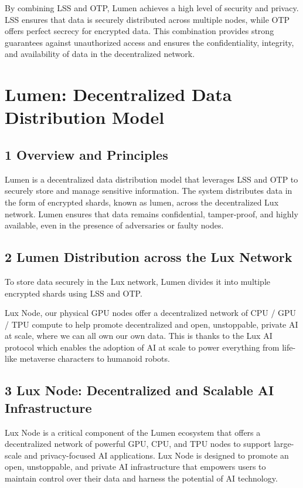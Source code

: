 \documentclass[11pt]{article}
\begin{document}
By combining LSS and OTP, Lumen achieves a high level of security and privacy. LSS ensures that data is securely distributed across multiple nodes, while OTP offers perfect secrecy for encrypted data. This combination provides strong guarantees against unauthorized access and ensures the confidentiality, integrity, and availability of data in the decentralized network.


\section{Lumen: Decentralized Data Distribution Model}

\subsection{1 Overview and Principles}

Lumen is a decentralized data distribution model that leverages LSS and OTP to securely store and manage sensitive information. The system distributes data in the form of encrypted shards, known as lumen, across the decentralized Lux network. Lumen ensures that data remains confidential, tamper-proof, and highly available, even in the presence of adversaries or faulty nodes.


\subsection{2 Lumen Distribution across the Lux Network}

To store data securely in the Lux network, Lumen divides it into multiple encrypted shards using LSS and OTP.


Lux Node, our physical GPU nodes offer a decentralized network of CPU / GPU / TPU compute to help promote decentralized and open, unstoppable, private AI at scale, where we can all own our own data. This is thanks to the Lux AI protocol which enables the adoption of AI at scale to power everything from life-like metaverse characters to humanoid robots.


\subsection{3 Lux Node: Decentralized and Scalable AI Infrastructure}

Lux Node is a critical component of the Lumen ecosystem that offers a decentralized network of powerful GPU, CPU, and TPU nodes to support large-scale and privacy-focused AI applications. Lux Node is designed to promote an open, unstoppable, and private AI infrastructure that empowers users to maintain control over their data and harness the potential of AI technology.
\end{document}
